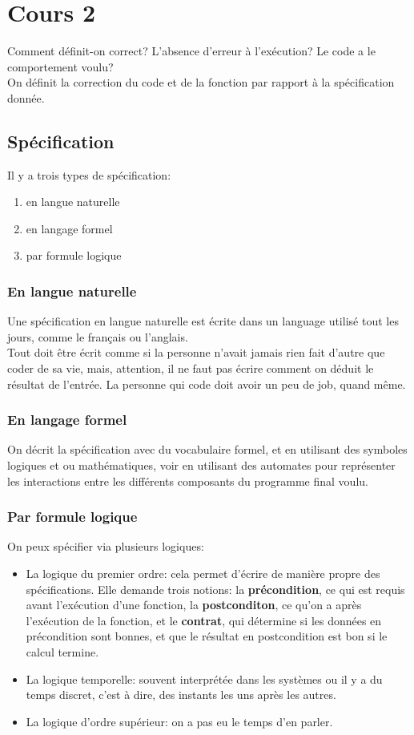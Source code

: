 \section{Cours 2}
Comment définit-on correct? L'absence d'erreur à l'exécution? Le code a le comportement voulu?\\
On définit la correction du code et de la fonction par rapport à la spécification donnée.

\subsection{Spécification}
Il y a trois types de spécification:
\begin{enumerate}
	\item en langue naturelle
	\item en langage formel
	\item par formule logique
\end{enumerate}

\subsubsection{En langue naturelle}
Une spécification en langue naturelle est écrite dans un language utilisé tout les jours, comme le français ou
l'anglais.\\
Tout doit être écrit comme si la personne n'avait jamais rien fait d'autre que coder de sa vie, mais, attention, il ne
faut pas écrire comment on déduit le résultat de l'entrée. La personne qui code doit avoir un peu de job, quand même.

\subsubsection{En langage formel}
On décrit la spécification avec du vocabulaire formel, et en utilisant des symboles logiques et ou mathématiques, voir
en utilisant des automates pour représenter les interactions entre les différents composants du programme final voulu.

\subsubsection{Par formule logique}
On peux spécifier via plusieurs logiques:
\begin{itemize}
	\item La logique du premier ordre: cela permet d'écrire de manière propre des spécifications. Elle demande trois
	notions: la \textbf{précondition}, ce qui est requis avant l'exécution d'une fonction, la \textbf{postconditon}, ce 
	qu'on a après l'exécution de la fonction, et le \textbf{contrat}, qui détermine si les données en précondition sont 
	bonnes, et que le résultat en postcondition est bon si le calcul termine.
	\item La logique temporelle: souvent interprétée dans les systèmes ou il y a du temps discret, c'est à dire, des
	instants les uns après les autres.
	\item La logique d'ordre supérieur: on a pas eu le temps d'en parler.
\end{itemize}
